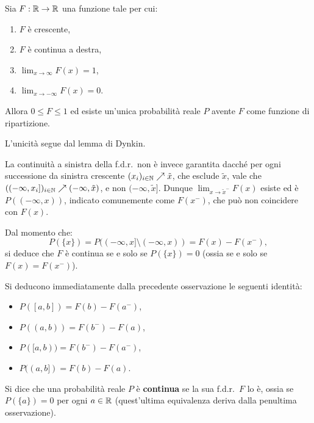 \begin{multicols*}{2}
\begin{proposition}
    Sia $F : \mathbb{R} \to \mathbb{R}$ una funzione tale per cui:
    \begin{enumerate}[(i.)]
        \item $F$ è crescente,
        \item $F$ è continua a destra,
        \item $\lim_{x \to \infty} F(x) = 1$,
        \item $\lim_{x \to -\infty} F(x) = 0$.
    \end{enumerate}
    Allora $0 \leq F \leq 1$ ed esiste un'unica probabilità reale $P$ avente
    $F$ come funzione di ripartizione. \smallskip


    L'unicità segue dal lemma di Dynkin.
\end{proposition}

\begin{remark}
    La continuità a sinistra della f.d.r.~non è invece garantita dacché per ogni successione da sinistra crescente
    $(x_i)_{i \in \mathbb{N}} \nearrow \tilde{x}$, che esclude $\tilde{x}$,
    vale che $((-\infty, x_i])_{i \in \mathbb{N}} \nearrow (-\infty, \tilde{x})$, e non
    $(-\infty, \tilde{x}]$. Dunque $\lim_{x \to \tilde{x}^-} F(x)$ esiste ed è $P((-\infty, x))$, indicato
    comunemente come $F(x^-)$, che può non coincidere con $F(x)$. \smallskip

    Dal momento che:
    \[
        P(\{x\}) = P((-\infty, x] \setminus (-\infty, x)) = F(x) - F(x^-),
    \]
    si deduce che $F$ è continua se e solo se $P(\{x\}) = 0$ (ossia se e solo se
    $F(x) = F(x^-)$).
\end{remark}

\begin{remark}
    Si deducono immediatamente dalla precedente osservazione le seguenti identità:
    \begin{itemize}
        \item $P([a, b]) = F(b) - F(a^-)$,
        \item $P((a, b)) = F(b^-) - F(a)$,
        \item $P([a, b)) = F(b^-) - F(a^-)$,
        \item $P((a, b]) = F(b) - F(a)$.
    \end{itemize} 
\end{remark}

\begin{definition}[$P$ continua]
    Si dice che una probabilità reale $P$ è \textbf{continua} se
    la sua f.d.r.~$F$ lo è, ossia se $P(\{a\}) = 0$ per ogni $a \in \mathbb{R}$
    (quest'ultima equivalenza deriva dalla penultima osservazione). 
\end{definition}


\end{multicols*}
